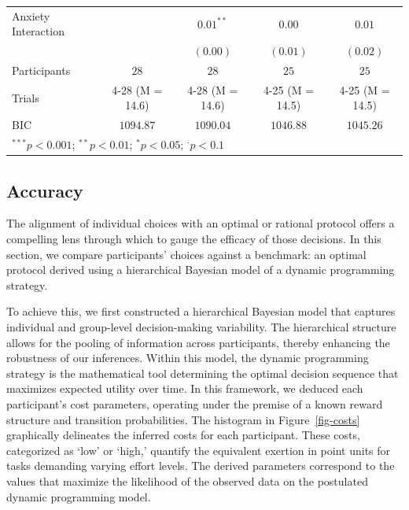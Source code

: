 \documentclass[
]{report}
\begin{document}
\begin{table}
\begin{minipage}[t]{\linewidth}
{\begin{center}
\begin{tabular}{l c c c c}
Anxiety Interaction &                 & $0.01^{**}$     & $0.00$          & $0.01$          \\
                    &                 & $(0.00)$        & $(0.01)$        & $(0.02)$        \\
\hline
Participants        & $28$            & $28$            & $25$            & $25$            \\
Trials              & 4-28 (M = 14.6) & 4-28 (M = 14.6) & 4-25 (M = 14.5) & 4-25 (M = 14.5) \\
BIC                 & $1094.87$       & $1090.04$       & $1046.88$       & $1045.26$       \\
\hline
\multicolumn{5}{l}{\scriptsize{$^{***}p<0.001$; $^{**}p<0.01$; $^{*}p<0.05$; $^{\cdot}p<0.1$}}
\end{tabular}

\label{table:coefficients}
\end{center}

}

\end{minipage}%

\end{table}

\begin{table}

\end{table}

\hypertarget{sec-pilotaccuracy}{%
\subsection{Accuracy}\label{sec-pilotaccuracy}}

The alignment of individual choices with an optimal or rational protocol
offers a compelling lens through which to gauge the efficacy of those
decisions. In this section, we compare participants' choices against a
benchmark: an optimal protocol derived using a hierarchical Bayesian
model of a dynamic programming strategy.

To achieve this, we first constructed a hierarchical Bayesian model that
captures individual and group-level decision-making variability. The
hierarchical structure allows for the pooling of information across
participants, thereby enhancing the robustness of our inferences. Within
this model, the dynamic programming strategy is the mathematical tool
determining the optimal decision sequence that maximizes expected
utility over time. In this framework, we deduced each participant's cost
parameters, operating under the premise of a known reward structure and
transition probabilities. The histogram in Figure~\ref{fig-costs}
graphically delineates the inferred costs for each participant. These
costs, categorized as `low' or `high,' quantify the equivalent exertion
in point units for tasks demanding varying effort levels. The derived
parameters correspond to the values that maximize the likelihood of the
observed data on the postulated dynamic programming model.
\end{document}
